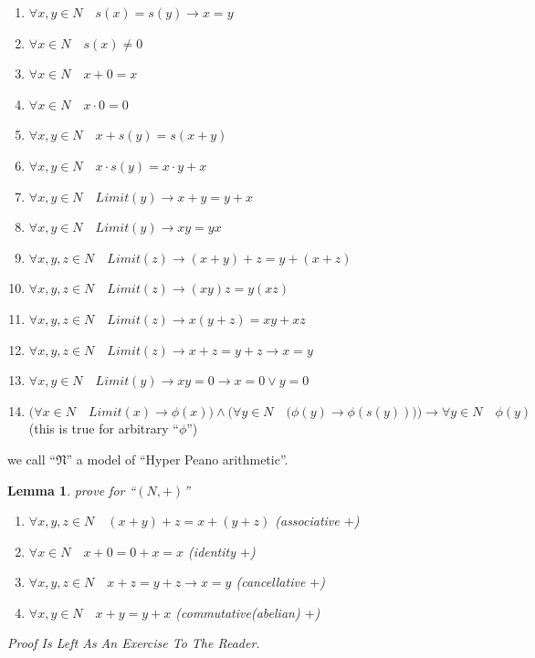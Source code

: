 \documentclass[10pt,a4paper]{book}
\newtheorem{lemma}{Lemma}[section]
\begin{document}
\begin{enumerate}
    \setlength{\itemsep}{0pt} %
    \item       $\forall x , y  \in N \quad s(x ) = s( y ) \to x = y   $
    \item       $\forall x  \in N \quad s(x ) \not= 0$
    \item       $\forall x  \in N \quad x +0 = x $
    \item       $\forall x  \in N \quad x  \cdot 0 = 0$
    \item       $\forall x , y  \in N \quad x +s( y ) = s(x  + y )  $
    \item       $\forall x , y  \in N \quad x  \cdot s( y ) = x  \cdot  y + x    $
    \item       $\forall x , y  \in N \quad Limit(y) \to x + y = y + x $
    \item       $\forall x , y  \in N \quad Limit(y) \to x  y = y  x $
    \item       $\forall x , y , z \in N \quad Limit(z) \to (x + y) + z = y + (x + z) $
    \item       $\forall x , y , z \in N \quad Limit(z) \to (x  y)  z = y  (x  z) $
    \item       $\forall x , y , z \in N \quad Limit(z) \to x ( y + z ) = x y + x  z $
    \item       $\forall x , y , z  \in N \quad Limit(z) \to x  +  z  =  y  +  z   \to x  =  y  $
    \item       $\forall x  , y    \in N \quad Limit(y) \to  x   y  = 0   \to  x  = 0  \lor   y  = 0 $
    \item        $\Big( \forall x \in N \quad Limit(x) \to  \phi(x) \Big) \land
              \Big( \forall  y  \in N \quad \big( \phi( y ) \to \phi(s( y )) \big) \Big) \to \forall  y \in N \quad \phi( y ) $
          (this is true for arbitrary ``$\phi$'')
\end{enumerate}
we call ``$\mathfrak{N}$'' a model of ``Hyper Peano arithmetic''.

\begin{lemma}prove for ``$(N , +)$''
    \begin{enumerate}
        \setlength{\itemsep}{0pt} %
        \item       $\forall x , y , z  \in N \quad (x + y )+ z  = x +( y + z )  $ (associative $+$)
        \item       $\forall x  \in N \quad x  + 0 = 0 + x  = x $ (identity  $+$)
        \item       $\forall x , y , z  \in N \quad x  +  z  =  y  +  z   \to x  =  y  $ (cancellative  $+$)
        \item       $\forall x , y  \in N \quad x + y  =  y + x $  (commutative(abelian)  $+$)
    \end{enumerate}
    Proof Is Left As An Exercise To The Reader.
\end{lemma}
\end{document}

